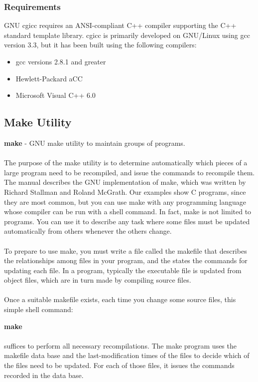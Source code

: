 \subsubsection{Requirements}

GNU cgicc requires an ANSI-compliant C++ compiler supporting the C++
standard template library. cgicc is primarily developed on GNU/Linux
using gcc version 3.3, but it has been built using the following
compilers:

\begin{itemize}
\item gcc versions 2.8.1 and greater 
\item Hewlett-Packard aCC
\item Microsoft Visual C++ 6.0 
\end{itemize}

\newpage

\subsection{Make Utility}

{\bf make} - GNU make utility to maintain groups of programs.\\ \\
The purpose of the make utility is to determine automatically which
pieces of a large program need to be recompiled, and issue the
commands to recompile them. The manual describes the GNU
implementation of make, which was written by Richard Stallman and
Roland McGrath. Our examples show C programs, since they are most
common, but you can use make with any programming language whose
compiler can be run with a shell command. In fact, make is not limited
to programs. You can use it to describe any task where some files must
be updated automatically from others whenever the others change.\\ \\
To prepare to use make, you must write a file called the makefile that
describes the relationships among files in your program, and the
states the commands for updating each file. In a program, typically
the executable file is updated from object files, which are in turn
made by compiling source files.\\ \\
Once a suitable makefile exists, each time you change some source
files, this simple shell command: 

{\bf make} \\ \\
suffices to perform all necessary recompilations. The make program
uses the makefile data base and the last-modification times of the
files to decide which of the files need to be updated. For each of
those files, it issues the commands recorded in the data base. 

